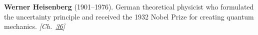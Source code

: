\nobelphysics \textbf{Werner Heisenberg} (1901–1976). German theoretical physicist who formulated the uncertainty principle and received the 1932 Nobel Prize for creating quantum mechanics. \emph{[Ch.~\hyperref[ch:qftvsgr]{36}]}

